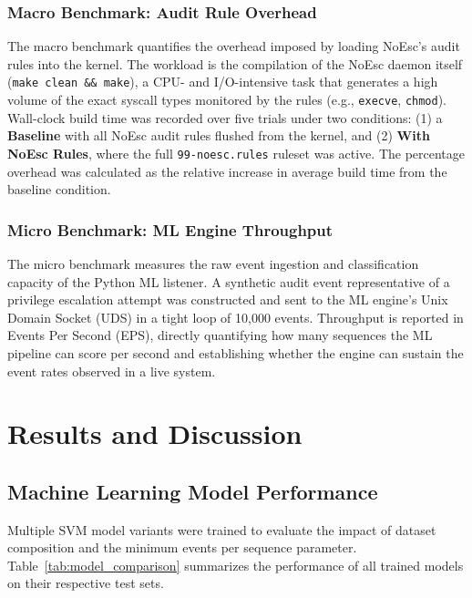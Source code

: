 \documentclass[journal]{./IEEEtran}
\begin{document}
\subsubsection{Macro Benchmark: Audit Rule Overhead}
The macro benchmark quantifies the overhead imposed by loading NoEsc's audit rules into the kernel. The workload is the compilation of the NoEsc daemon itself (\texttt{make clean \&\& make}), a CPU- and I/O-intensive task that generates a high volume of the exact syscall types monitored by the rules (e.g., \texttt{execve}, \texttt{chmod}). Wall-clock build time was recorded over five trials under two conditions: (1) a \textbf{Baseline} with all NoEsc audit rules flushed from the kernel, and (2) \textbf{With NoEsc Rules}, where the full \texttt{99-noesc.rules} ruleset was active. The percentage overhead was calculated as the relative increase in average build time from the baseline condition.

\subsubsection{Micro Benchmark: ML Engine Throughput}
The micro benchmark measures the raw event ingestion and classification capacity of the Python ML listener. A synthetic audit event representative of a privilege escalation attempt was constructed and sent to the ML engine's Unix Domain Socket (UDS) in a tight loop of 10,000 events. Throughput is reported in Events Per Second (EPS), directly quantifying how many sequences the ML pipeline can score per second and establishing whether the engine can sustain the event rates observed in a live system.

\section{Results and Discussion}

\subsection{Machine Learning Model Performance}

Multiple SVM model variants were trained to evaluate the impact of dataset composition and the minimum events per sequence parameter. Table~\ref{tab:model_comparison} summarizes the performance of all trained models on their respective test sets.
\end{document}

